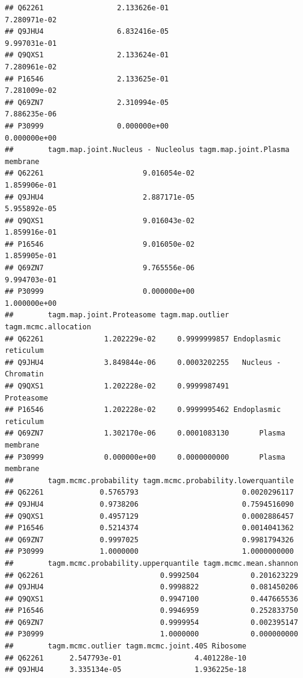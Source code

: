 \documentclass[
]{article}
\begin{document}
\begin{verbatim}
## Q62261                 2.133626e-01                       7.280971e-02
## Q9JHU4                 6.832416e-05                       9.997031e-01
## Q9QXS1                 2.133624e-01                       7.280961e-02
## P16546                 2.133625e-01                       7.281009e-02
## Q69ZN7                 2.310994e-05                       7.886235e-06
## P30999                 0.000000e+00                       0.000000e+00
##        tagm.map.joint.Nucleus - Nucleolus tagm.map.joint.Plasma membrane
## Q62261                       9.016054e-02                   1.859906e-01
## Q9JHU4                       2.887171e-05                   5.955892e-05
## Q9QXS1                       9.016043e-02                   1.859916e-01
## P16546                       9.016050e-02                   1.859905e-01
## Q69ZN7                       9.765556e-06                   9.994703e-01
## P30999                       0.000000e+00                   1.000000e+00
##        tagm.map.joint.Proteasome tagm.map.outlier  tagm.mcmc.allocation
## Q62261              1.202229e-02     0.9999999857 Endoplasmic reticulum
## Q9JHU4              3.849844e-06     0.0003202255   Nucleus - Chromatin
## Q9QXS1              1.202228e-02     0.9999987491            Proteasome
## P16546              1.202228e-02     0.9999995462 Endoplasmic reticulum
## Q69ZN7              1.302170e-06     0.0001083130       Plasma membrane
## P30999              0.000000e+00     0.0000000000       Plasma membrane
##        tagm.mcmc.probability tagm.mcmc.probability.lowerquantile
## Q62261             0.5765793                        0.0020296117
## Q9JHU4             0.9738206                        0.7594516090
## Q9QXS1             0.4957129                        0.0002886457
## P16546             0.5214374                        0.0014041362
## Q69ZN7             0.9997025                        0.9981794326
## P30999             1.0000000                        1.0000000000
##        tagm.mcmc.probability.upperquantile tagm.mcmc.mean.shannon
## Q62261                           0.9992504            0.201623229
## Q9JHU4                           0.9998822            0.081450206
## Q9QXS1                           0.9947100            0.447665536
## P16546                           0.9946959            0.252833750
## Q69ZN7                           0.9999954            0.002395147
## P30999                           1.0000000            0.000000000
##        tagm.mcmc.outlier tagm.mcmc.joint.40S Ribosome
## Q62261      2.547793e-01                 4.401228e-10
## Q9JHU4      3.335134e-05                 1.936225e-18

\end{verbatim}
\end{document}
